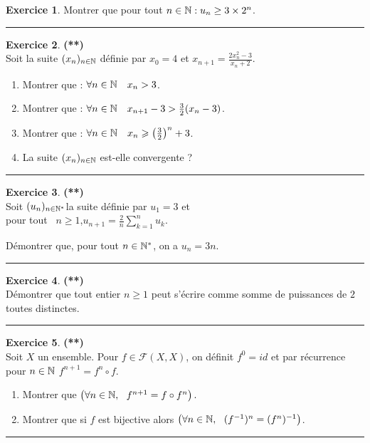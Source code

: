 \documentclass[a4paper,11pt]{article}
\theoremstyle{definition}
\newtheorem{exo}{Exercice} %
\begin{document}
\begin{minipage}{1\linewidth}
\begin{minipage}[t]{0.48\linewidth}
\begin{exo}
		Montrer que pour
		tout $n \in \mathbb{N} : u_n\geq  3 \times 2^n $.
		
		\centering
		\rule{1\linewidth}{0.6pt}
	\end{exo}
		
		\begin{exo}\textbf{(**)}\quad\\[0.2cm]
			Soit la suite $(x_n)_{n\in \mathbb{N}}$ d\'efinie par
			$x_0=4$ et $\displaystyle{x_{n+1}=\frac{2x_n^2-3}{x_n+2}}$.
			\begin{enumerate}
				\item Montrer que : $\forall n\in\mathbb{N}\quad x_n>3$.
				\item Montrer que : $\forall n\in\mathbb{N} \quad x_{n+1}-3>\frac{3}{2}(x_n-3)$.
				\item Montrer que : $\forall n\in\mathbb{N} \quad x_n \geqslant \left(\frac{3}{2}\right)^n+3$.
				\item La suite $(x_n)_{n\in\mathbb{N}}$ est-elle convergente ?
				
			\end{enumerate}
			
			\centering
			\rule{1\linewidth}{0.6pt}
		\end{exo}
	
	

		\begin{exo}\textbf{(**)}\quad\\[0.2cm]
	Soit $(u_n)_{n\in\mathbb{N}^*} $la suite définie par $u_1=3$ et \\pour tout \ $n\geq1$,\quad $u_{n+1} = \frac{2}{n}\sum_{k=1}^{n}u_k$. 
	
	Démontrer que, pour tout $n\in\mathbb{N}^*$, on a $u_n=3n$.
	
	\centering
	\rule{1\linewidth}{0.6pt}
\end{exo}

		\begin{exo}\textbf{(**)}\quad\\[0.2cm]
			
	Démontrer que tout entier $n\geq1$ peut s'écrire comme somme de puissances de $2$ toutes distinctes.
	
	\centering
	\rule{1\linewidth}{0.6pt}
\end{exo}

\begin{exo}\textbf{(**)}\quad\\[0.2cm]
	Soit $X$ un ensemble. Pour $f \in \mathcal{F} (X, X)$, on d\'efinit $f^0 = id$ et
	par r\'ecurrence pour $n \in \mathbb{N}$ $f^{n + 1} = f^n \circ f$.
	\begin{enumerate}
		\item Montrer que $\left(\forall n \in \N, \ \  f^{n + 1} = f \circ f^n \right).$
		\item Montrer que si $f$ est bijective alors $\left(\forall n \in \N,\ \  (f^{-1})^n
		= (f^n)^{-1}\right)$.
	\end{enumerate}
	
	\centering
	\rule{1\linewidth}{0.6pt}
\end{exo}


		
	\end{minipage}
\end{minipage}
\end{document}
